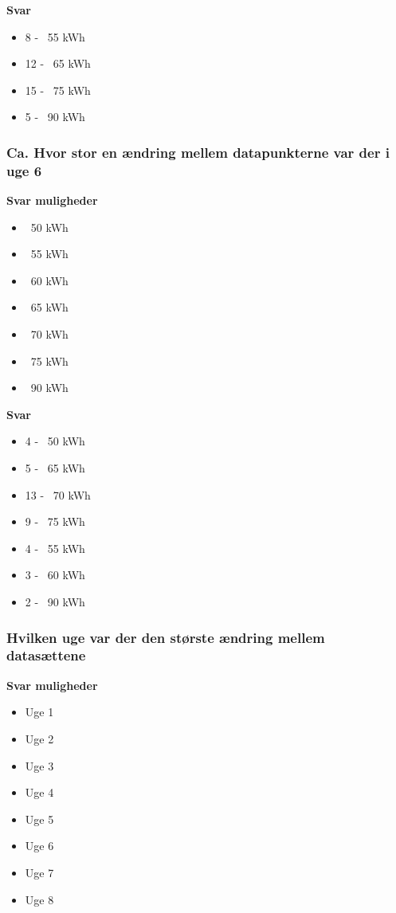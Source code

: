 \textbf{Svar}
\begin{itemize}
    \item 8 - ~55 kWh
    \item 12 - ~65 kWh
    \item 15 - ~75 kWh
    \item 5 - ~90 kWh
\end{itemize}

\subsubsection{Ca. Hvor stor en ændring mellem datapunkterne var der i uge 6}
\textbf{Svar muligheder}
\begin{itemize}
    \item ~50 kWh
    \item ~55 kWh
    \item ~60 kWh
    \item ~65 kWh
    \item ~70 kWh
    \item ~75 kWh
    \item ~90 kWh
\end{itemize}

\textbf{Svar}
\begin{itemize}
    \item 4 - ~50 kWh
    \item 5 - ~65 kWh
    \item 13 - ~70 kWh
    \item 9 - ~75 kWh
    \item 4 - ~55 kWh
    \item 3 - ~60 kWh
    \item 2 - ~90 kWh
\end{itemize}

\subsubsection{Hvilken uge var der den største ændring mellem datasættene}
\textbf{Svar muligheder}
\begin{itemize}
    \item Uge 1
    \item Uge 2
    \item Uge 3
    \item Uge 4
    \item Uge 5
    \item Uge 6
    \item Uge 7
    \item Uge 8
\end{itemize}

